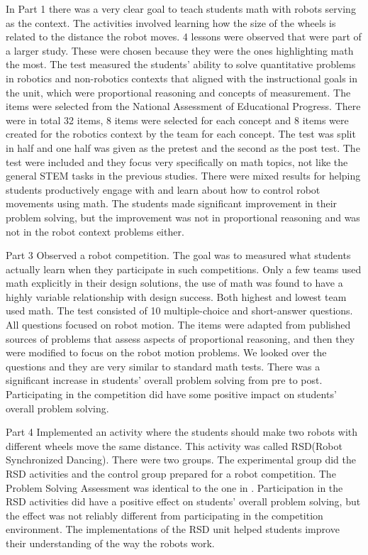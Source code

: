 \bigskip\noindent
In Part 1 there was a very clear goal to teach students math with robots serving as the context. The activities involved learning how the size of the wheels is related to the distance the robot moves. 4 lessons were observed that were part of a larger study. These were chosen because they were the ones highlighting math the most. The test measured the students' ability to solve quantitative problems in robotics and non-robotics contexts that aligned with the instructional goals in the unit, which were proportional reasoning and concepts of measurement. The items were selected from the National Assessment of Educational Progress. There were in total 32 items, 8 items were selected for each concept and 8 items were created for the robotics context by the team for each concept. The test was split in half and one half was given as the pretest and the second as the post test. The test were included and they focus very specifically on math topics, not like the general STEM tasks in the previous studies. There were mixed results for helping students productively engage with and learn about how to control robot movements using math. The students made significant improvement in their problem solving, but the improvement was not in proportional reasoning and was not in the robot context problems either. 

\bigskip\noindent
Part 3 Observed a robot competition. The goal was to measured what students actually learn when they participate in such competitions. Only a few teams used math explicitly in their design solutions, the use of math was found to have a highly variable relationship with design success. Both highest and lowest team used math. The test consisted of 10 multiple-choice and short-answer questions. All questions focused on robot motion. The items were adapted from published sources of problems that assess aspects of proportional reasoning, and then they were modified to focus on the robot motion problems. We looked over the questions and they are very similar to standard math tests. There was a significant increase in students' overall problem solving from pre to post. Participating in the competition did have some positive impact on students' overall problem solving.

\bigskip\noindent
Part 4 Implemented an activity where the students should make two robots with different wheels move the same distance. This activity was called RSD(Robot Synchronized Dancing). There were two groups. The experimental group did the RSD activities and the control group prepared for a robot competition. The Problem Solving Assessment was identical to the one in \cite{silk2011resources}. Participation in the RSD activities did have a positive effect on students' overall problem solving, but the effect was not reliably different from participating in the competition environment. The implementations of the RSD unit helped students improve their understanding of the way the robots work. 

